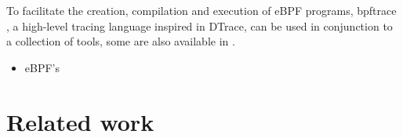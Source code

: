 \documentclass[conference]{IEEEtran}
\begin{document}
    To facilitate the creation, compilation and execution of eBPF programs, bpftrace \cite{bpftrace}, a high-level tracing language inspired in DTrace, can be used in conjunction to a collection of tools, some are also available in \cite{bgreggBook}.
\begin{itemize}
    \item eBPF's
\end{itemize}

\section{Related work}

\end{document}

